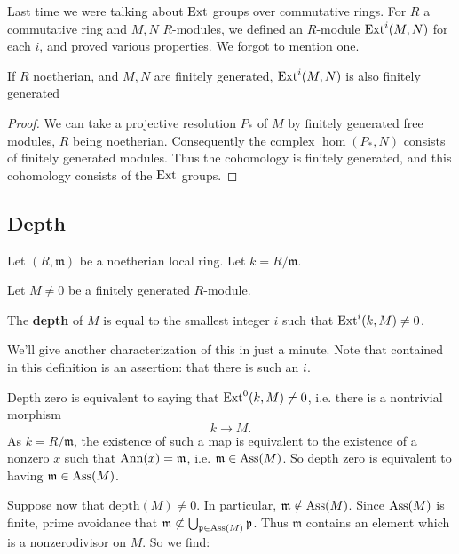 Last time we were talking about $\mathrm{Ext}$ groups over commutative
rings. For $R$ a
commutative ring and $M,N$ $R$-modules, we defined an $R$-module
$\mathrm{Ext}^i(M,N)$ for
each $i$, and proved various properties. We forgot to mention
one.

\begin{proposition} 
If $R$ noetherian, and $M,N$ are finitely generated,
$\mathrm{Ext}^i(M,N)$ is also finitely generated
\end{proposition} 
\begin{proof} 
We can take a projective resolution $P_*$ of $M$ by finitely
generated free modules, $R$ being
noetherian. Consequently the complex $\hom(P_*, N)$ consists of
finitely
generated modules. Thus the cohomology is finitely generated,
and this cohomology
consists of the $\mathrm{Ext}$ groups.
\end{proof} 


\subsection{Depth} Let $(R, \mathfrak{m})$ be  a noetherian
local ring. Let $k = R/\mathfrak{m}$. 

Let $M \neq 0$ be a finitely generated $R$-module. 

\newcommand{\depth}{\mathrm{depth}}
\begin{definition} 
The \textbf{depth} of $M$ is equal to the smallest integer $i$
such that
$\mathrm{Ext}^i(k,M) \neq 0$.
\end{definition} 

We'll give another characterization of this in just a minute.
Note that
contained in this definition is an assertion: that there is such
an $i$.

\begin{example} 
Depth zero is equivalent to saying that $\mathrm{Ext}^0(k,M) \neq 0$,
i.e. there is a
nontrivial morphism
\[ k \to M.  \]
As $k = R/\mathfrak{m}$, the existence of such a map is
equivalent to the existence of a nonzero $x$
such that $\operatorname{Ann}(x) = \mathfrak{m}$, i.e. $\mathfrak{m} \in
\operatorname{Ass}(M)$. So depth
zero is equivalent to having $\mathfrak{m} \in \operatorname{Ass}(M)$.
\end{example} 

Suppose now that $\depth(M) \neq 0$. In particular,
$\mathfrak{m} \notin
\operatorname{Ass}(M)$. Since $\operatorname{Ass}(M)$ is finite, prime avoidance that
$\mathfrak{m}
\not\subset \bigcup_{\mathfrak{p} \in \operatorname{Ass}(M)} \mathfrak{p}$.
Thus
$\mathfrak{m}$ contains an element which is a nonzerodivisor on
$M$. So we find:


